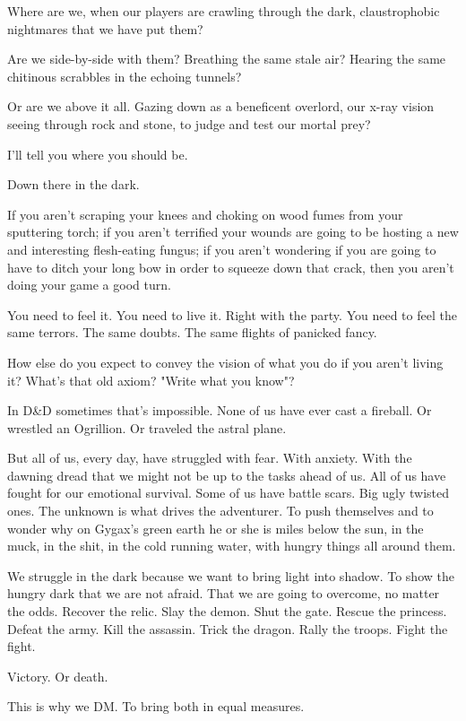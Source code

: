 Where are we, when our players are crawling through the dark, claustrophobic nightmares that we have put them?\par
Are we side-by-side with them? Breathing the same stale air? Hearing the same chitinous scrabbles in the echoing tunnels?\par
Or are we above it all. Gazing down as a beneficent overlord, our x-ray vision seeing through rock and stone, to judge and test our mortal prey?\par
I'll tell you where you should be.\par
Down there in the dark.\par
If you aren't scraping your knees and choking on wood fumes from your sputtering torch; if you aren't terrified your wounds are going to be hosting a new and interesting flesh-eating fungus; if you aren't wondering if you are going to have to ditch your long bow in order to squeeze down that crack, then you aren't doing your game a good turn.\par
You need to feel it. You need to live it. Right with the party. You need to feel the same terrors. The same doubts. The same flights of panicked fancy.\par
How else do you expect to convey the vision of what you do if you aren't living it? What's that old axiom? "Write what you know"?\par
In D\&D sometimes that's impossible. None of us have ever cast a fireball. Or wrestled an Ogrillion. Or traveled the astral plane.\par
But all of us, every day, have struggled with fear. With anxiety. With the dawning dread that we might not be up to the tasks ahead of us. All of us have fought for our emotional survival. Some of us have battle scars. Big ugly twisted ones.
The unknown is what drives the adventurer. To push themselves and to wonder why on Gygax's green earth he or she is miles below the sun, in the muck, in the shit, in the cold running water, with hungry things all around them.\par
We struggle in the dark because we want to bring light into shadow. To show the hungry dark that we are not afraid. That we are going to overcome, no matter the odds.
Recover the relic. Slay the demon. Shut the gate. Rescue the princess. Defeat the army. Kill the assassin. Trick the dragon. Rally the troops. Fight the fight.\par
Victory. Or death.\par
This is why we DM. To bring both in equal measures.\par
